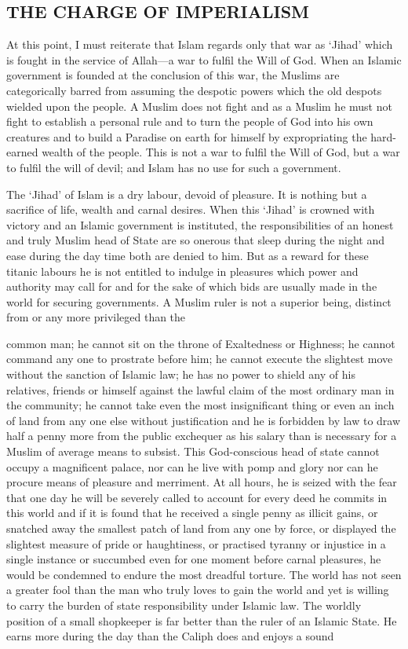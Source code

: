 \hypertarget{the-charge-of-imperialism}{%
\subsection{THE CHARGE OF IMPERIALISM}\label{the-charge-of-imperialism}}

At this point, I must reiterate that Islam regards only that war as
`Jihad' which is fought in the service of Allah---a war to fulfil the
Will of God. When an Islamic government is founded at the conclusion of
this war, the Muslims are categorically barred from assuming the
despotic powers which the old despots wielded upon the people. A Muslim
does not fight and as a Muslim he must not fight to establish a personal
rule and to turn the people of God into his own creatures and to build a
Paradise on earth for himself by expropriating the hard- earned wealth
of the people. This is not a war to fulfil the Will of God, but a war to
fulfil the will of devil; and Islam has no use for such a government.

The `Jihad' of Islam is a dry labour, devoid of pleasure. It is nothing
but a sacrifice of life, wealth and carnal desires. When this `Jihad' is
crowned with victory and an Islamic government is instituted, the
responsibilities of an honest and truly Muslim head of State are so
onerous that sleep during the night and ease during the day time both
are denied to him. But as a reward for these titanic labours he is not
entitled to indulge in pleasures which power and authority may call for
and for the sake of which bids are usually made in the world for
securing governments. A Muslim ruler is not a superior being, distinct
from or any more privileged than the

common man; he cannot sit on the throne of Exaltedness or Highness; he
cannot command any one to prostrate before him; he cannot execute the
slightest move without the sanction of Islamic law; he has no power to
shield any of his relatives, friends or himself against the lawful claim
of the most ordinary man in the community; he cannot take even the most
insignificant thing or even an inch of land from any one else without
justification and he is forbidden by law to draw half a penny more from
the public exchequer as his salary than is necessary for a Muslim of
average means to subsist. This God-conscious head of state cannot occupy
a magnificent palace, nor can he live with pomp and glory nor can he
procure means of pleasure and merriment. At all hours, he is seized with
the fear that one day he will be severely called to account for every
deed he commits in this world and if it is found that he received a
single penny as illicit gains, or snatched away the smallest patch of
land from any one by force, or displayed the slightest measure of pride
or haughtiness, or practised tyranny or injustice in a single instance
or succumbed even for one moment before carnal pleasures, he would be
condemned to endure the most dreadful torture. The world has not seen a
greater fool than the man who truly loves to gain the world and yet is
willing to carry the burden of state responsibility under Islamic law.
The worldly position of a small shopkeeper is far better than the ruler
of an Islamic State. He earns more during the day than the Caliph does
and enjoys a sound

